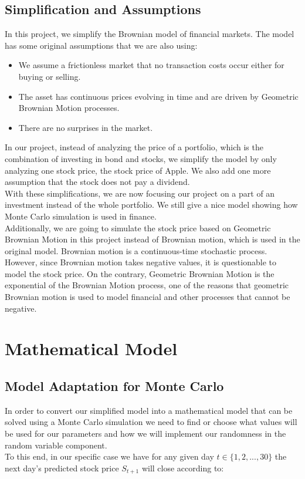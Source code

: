 \documentclass{article}
\begin{document}
\subsection{Simplification and Assumptions}
In this project, we simplify the Brownian model of financial markets. The model has some original assumptions that we are also using: \cite{WikiBModel}
\begin{itemize}
	\item We assume a frictionless market that no transaction costs occur either for buying or selling.
    \item The asset has continuous prices evolving in time and are driven by Geometric Brownian Motion processes.
    \item There are no surprises in the market. 
\end{itemize}
In our project, instead of analyzing the price of a portfolio, which is the combination of investing in bond and stocks, we simplify the model by only analyzing one stock price, the stock price of Apple. We also add one more assumption that the stock does not pay a dividend.\\
With these simplifications, we are now focusing our project on a part of an investment instead of the whole portfolio. We still give a nice model showing how Monte Carlo simulation is used in finance. \\
Additionally, we are going to simulate the stock price based on Geometric Brownian Motion in this project instead of Brownian motion, which is used in the original model. Brownian motion is a continuous-time stochastic process. However, since Brownian motion takes negative values, it is questionable to model the stock price. On the contrary, Geometric Brownian Motion is the exponential of the Brownian Motion process, one of the reasons that geometric Brownian motion is used to model financial and other processes that cannot be negative.\cite{GBMoverBM} \\

\section{Mathematical Model}

\subsection{Model Adaptation for Monte Carlo}
In order to convert our simplified model into a mathematical model that can be solved using a Monte Carlo simulation we need to find or choose what values will be used for our parameters and how we will implement our randomness in the random variable component.\\
To this end, in our specific case we have for any given day $t \in \{1,2,...,30\}$ the next day's predicted stock price $S_{t+1}$ will close according to:
\end{document}
